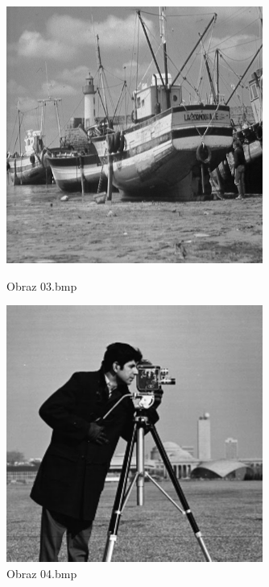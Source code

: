\documentclass[../EDI_Task4_Karwowski_Kowalewski.tex]{subfiles}
\begin{document}
{    \begin{figure}[!htbp]
        \begin{minipage}[c]{0.49\linewidth}
            \centering
            \includegraphics[width=0.75\textwidth]{img/original/03.png}
            \caption{Obraz 03.bmp}
        \end{minipage}\hfill
        \begin{minipage}[c]{0.49\linewidth}
            \centering
            \includegraphics[width=0.75\textwidth]{img/original/04.png}
            \caption{Obraz 04.bmp}
        \end{minipage}
    \end{figure}

}
\end{document}
